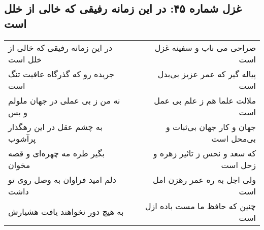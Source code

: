 \begin{center}
\section*{غزل شماره ۴۵: در این زمانه رفیقی که خالی از خلل است}
\label{sec:sh045}
\begin{longtable}{l p{0.5cm} r}
در این زمانه رفیقی که خالی از خلل است
&&
صراحی می ناب و سفینه غزل است
\\
جریده رو که گذرگاه عافیت تنگ است
&&
پیاله گیر که عمر عزیز بی‌بدل است
\\
نه من ز بی عملی در جهان ملولم و بس
&&
ملالت علما هم ز علم بی عمل است
\\
به چشم عقل در این رهگذار پرآشوب
&&
جهان و کار جهان بی‌ثبات و بی‌محل است
\\
بگیر طره مه چهره‌ای و قصه مخوان
&&
که سعد و نحس ز تاثیر زهره و زحل است
\\
دلم امید فراوان به وصل روی تو داشت
&&
ولی اجل به ره عمر رهزن امل است
\\
به هیچ دور نخواهند یافت هشیارش
&&
چنین که حافظ ما مست باده ازل است
\\
\end{longtable}
\end{center}
